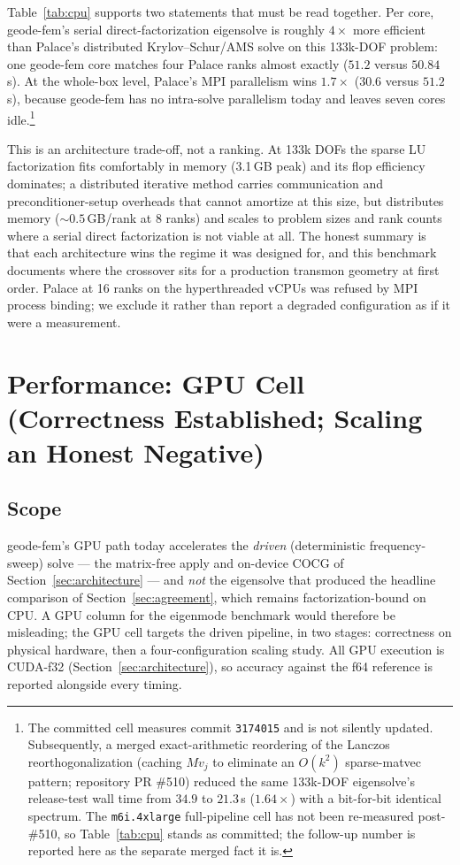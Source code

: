 \documentclass{anvil-paper}
\begin{document}
Table~\ref{tab:cpu} supports two statements that must be read together.
Per core, geode-fem's serial direct-factorization eigensolve is roughly
$4\times$ more efficient than Palace's distributed Krylov--Schur/AMS solve
on this 133k-DOF problem: one geode-fem core matches four Palace ranks
almost exactly ($51.2$ versus $50.84$\,s). At the whole-box level, Palace's
MPI parallelism wins $1.7\times$ ($30.6$ versus $51.2$\,s), because
geode-fem has no intra-solve parallelism today and leaves seven cores
idle.\footnote{The committed cell measures commit \texttt{3174015} and is
not silently updated. Subsequently, a merged exact-arithmetic reordering
of the Lanczos reorthogonalization (caching $M v_j$ to eliminate an
$O(k^2)$ sparse-matvec pattern; repository PR \#510) reduced the same
133k-DOF eigensolve's release-test wall time from $34.9$ to $21.3$\,s
($1.64\times$) with a bit-for-bit identical spectrum. The
\texttt{m6i.4xlarge} full-pipeline cell has not been re-measured
post-\#510, so Table~\ref{tab:cpu} stands as committed; the follow-up
number is reported here as the separate merged fact it is.}

This is an architecture trade-off, not a ranking. At 133k DOFs the sparse
LU factorization fits comfortably in memory (3.1\,GB peak) and its flop
efficiency dominates; a distributed iterative method carries communication
and preconditioner-setup overheads that cannot amortize at this size, but
distributes memory (${\sim}0.5$\,GB/rank at 8 ranks) and scales to problem
sizes and rank counts where a serial direct factorization is not viable at
all. The honest summary is that each architecture wins the regime it was
designed for, and this benchmark documents where the crossover sits for a
production transmon geometry at first order. Palace at 16 ranks on the
hyperthreaded vCPUs was refused by MPI process binding; we exclude it
rather than report a degraded configuration as if it were a measurement.

\section{Performance: GPU Cell (Correctness Established; Scaling an
Honest Negative)}
\label{sec:perf-gpu}

\subsection{Scope}

geode-fem's GPU path today accelerates the \emph{driven} (deterministic
frequency-sweep) solve --- the matrix-free apply and on-device COCG of
Section~\ref{sec:architecture} --- and \emph{not} the eigensolve that
produced the headline comparison of Section~\ref{sec:agreement}, which
remains factorization-bound on CPU. A GPU column for the eigenmode
benchmark would therefore be misleading; the GPU cell targets the driven
pipeline, in two stages: correctness on physical hardware, then a
four-configuration scaling study. All GPU execution is CUDA-f32
(Section~\ref{sec:architecture}), so accuracy against the f64 reference is
reported alongside every timing.
\end{document}
